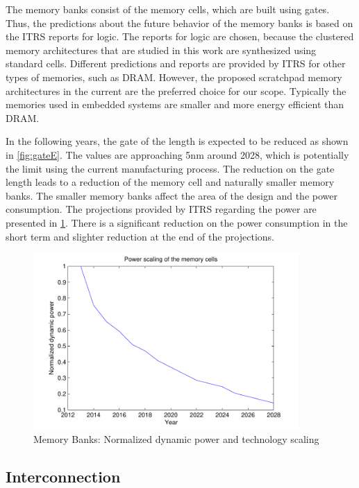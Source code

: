 The memory banks consist of the memory cells, which are built using gates.
Thus, the predictions about the future behavior of the memory banks is based on the ITRS reports for logic.
The reports for logic are chosen, because the clustered memory architectures that are studied in this work are synthesized using standard cells.
Different predictions and reports are provided by ITRS for other types of memories, such as DRAM.
However, the proposed scratchpad memory architectures in the current are the preferred choice for our scope.
Typically the memories used in embedded systems are smaller and more energy efficient than DRAM.

In the following years, the gate of the length is expected to be reduced as shown in \ref{fig:gateE}.
The values are approaching 5nm around 2028, which is potentially the limit using the current manufacturing process.
The reduction on the gate length leads to a reduction of the memory cell and naturally smaller memory banks.
The smaller memory banks affect the area of the design and the power consumption.
The projections provided by ITRS regarding the power are presented in \ref{fig:powerE}. 
There is a significant reduction on the power consumption in the short term and slighter reduction at the end of the projections.

  \begin{figure}
 \centering
 \includegraphics[width = 0.9\textwidth]{E/cellpower.pdf}
  \caption{Memory Banks: Normalized dynamic power and technology scaling}
 \label{fig:powerE}
 \end{figure}

\subsection{Interconnection}

